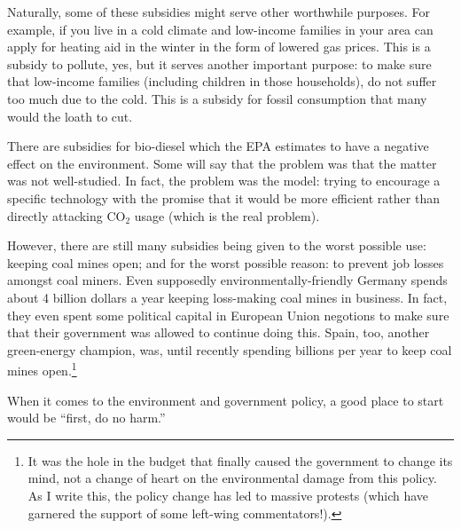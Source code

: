Naturally, some of these subsidies might serve other worthwhile purposes. For
example, if you live in a cold climate and low-income families in your area can
apply for heating aid in the winter in the form of lowered gas prices. This is
a subsidy to pollute, yes, but it serves another important purpose: to make
sure that low-income families (including children in those households), do not
suffer too much due to the cold. This is a subsidy for fossil consumption that
many would the loath to cut.


There are subsidies for bio-diesel which the EPA estimates to have a negative
effect on the environment. Some will say that the problem was that the matter was not well-studied.
In fact, the problem was the model: trying to encourage a specific technology
with the promise that it would be more efficient rather than directly attacking
CO${}_2$ usage (which is the real problem).

However, there are still many subsidies being given to the worst possible use:
keeping coal mines open; and for the worst possible reason: to prevent job
losses amongst coal miners. Even supposedly environmentally-friendly Germany
spends about 4 billion dollars a year keeping loss-making coal mines in
business. In fact, they even spent some political capital in European Union
negotions to make sure that their government was allowed to continue doing
this. Spain, too, another green-energy champion, was, until recently spending
billions per year to keep coal mines open.\footnote{It was the hole in the
budget that finally caused the government to change its mind, not a change of
heart on the environmental damage from this policy. As I write this, the policy
change has led to massive protests (which have garnered the support of some
left-wing commentators!).}

When it comes to the environment and government policy, a good place to start
would be ``first, do no harm.''

